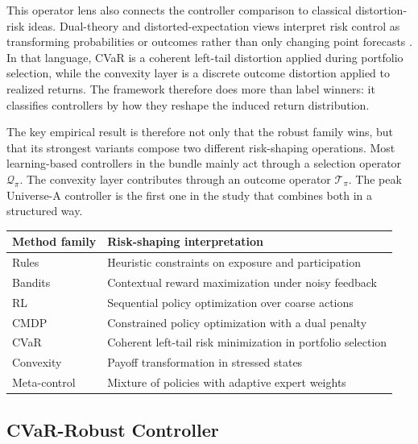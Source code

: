 \documentclass[10pt,twocolumn]{article}
\begin{document}
This operator lens also connects the controller comparison to classical distortion-risk ideas. Dual-theory and distorted-expectation views interpret risk control as transforming probabilities or outcomes rather than only changing point forecasts \cite{yaari1987,schmeidler1989,wang2000}. In that language, CVaR is a coherent left-tail distortion applied during portfolio selection, while the convexity layer is a discrete outcome distortion applied to realized returns. The framework therefore does more than label winners: it classifies controllers by how they reshape the induced return distribution.

The key empirical result is therefore not only that the robust family wins, but
that its strongest variants compose two different risk-shaping operations. Most
learning-based controllers in the bundle mainly act through a selection
operator $\mathcal{Q}_\pi$. The convexity layer contributes through an outcome
operator $\mathcal{T}_\pi$. The peak Universe-A controller is the first one in
the study that combines both in a structured way.

\begin{center}
\small
\begin{tabular}{@{} l l @{}}
\toprule
\textbf{Method family} & \textbf{Risk-shaping interpretation} \\
\midrule
Rules & Heuristic constraints on exposure and participation \\
Bandits & Contextual reward maximization under noisy feedback \\
RL & Sequential policy optimization over coarse actions \\
CMDP & Constrained policy optimization with a dual penalty \\
CVaR & Coherent left-tail risk minimization in portfolio selection \\
Convexity & Payoff transformation in stressed states \\
Meta-control & Mixture of policies with adaptive expert weights \\
\bottomrule
\end{tabular}
\end{center}

\subsection{CVaR-Robust Controller}
\end{document}
